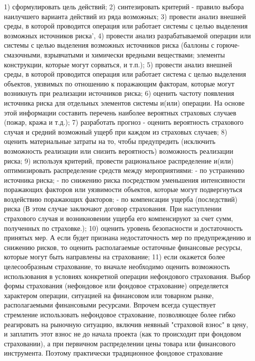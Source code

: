 1) сформулировать цель действий;
2) синтезировать критерий - правило выбора наилучшего варианта действий из
ряда возможных;
3) провести анализ внешней среды, в которой проводится операция или работает
системы с целью выделения возможных источников риска',
4) провести анализ разрабатываемой операции или системы с целью выделения
возможных источников риска (баллоны с горюче-смазочными, взрывчатыми и химически
вредными веществами; элементы конструкции, которые могут сорваться, и т.п.);
5) провести анализ внешней среды, в которой проводится операция или работает
система с целью выделения объектов, уязвимых по отношению к поражающим факторам,
которые могут возникнуть при реализации источников риска;
6) оценить частоту появления источника риска для отдельных элементов системы
и(или) операции. На основе этой информации составить перечень наиболее вероятных
страховых случаев (пожар, кража и т.д.);
7) разработать прогноз - оценить вероятность страхового случая и средний
возможный ущерб при каждом из страховых случаев;
8) оценить материальные затраты на то, чтобы предупредить (исключить
возможность реализации или снизить вероятность) возможность реализации риска;
9) используя критерий, провести рациональное распределение и(или)
оптимизировать распределение средств между мероприятиями:
- по устранению источника риска;
- по снижению риска посредством уменьшения интенсивности поражающих
факторов или уязвимости объектов, которые могут подвергнуться воздействию
поражающих факторов;
- по компенсации ущерба (последствий) риска (В этом случае заключают договор
страхования. При наступлении страхового случая и возникновении ущерба его
компенсируют за счет сумм, полученных по страховке.);
10) оценить уровень безопасности и достаточность принятых мер. А если будет
признана недостаточность мер по предупреждению и снижению рисков, то оценить
располагаемые остаточные финансовые ресурсы, которые могут быть направлены на
страхование;
11) если окажется более целесообразным страхование, то вначале необходимо
оценить возможность использования в условиях конкретной операции нефондового
страхования.
Выбор формы страхования (нефондовое или фондовое страхование) определяется
характером операции, ситуацией на финансовом или товарном рынке, располагаемыми
финансовыми ресурсами.
Впрочем всегда существует стремление использовать нефондовое страхование,
позволяющее более гибко реагировать на рыночную ситуацию, включив неявный
"страховой взнос" в цену, и заплатить этот взнос не до начала проекта (как то происходит
при фондовом страховании), а при первичном распределении цены товара или
финансового инструмента. Поэтому практически традиционное фондовое страхование
